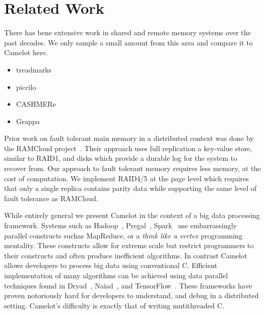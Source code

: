 \section{Related Work}
\label{sec:related}

There has bene extensive work in shared and remote memory systems over the past
decades. We only sample a small amount from this area and compare it to Camelot
here. 

\begin{itemize}
    \item treadmarks~\cite{Keleher1994}  \\
    \item piccilo~\cite{piccolo}   \\
    \item CASHMERe ~\cite{cashmere}   \\
    \item Grappa~\cite{Nelson2015} \\
\end{itemize}

Prior work on fault tolerant main memory in a distributed context was done by
the RAMCloud project~\cite{Ousterhout:2015:RSS:2818727.2806887}. Their approach
uses full replication a key-value store, similar to RAID1, and disks which
provide a durable log for the system to recover from.  Our approach to fault
tolerant memory requires less memory, at the cost of computation. We implement
RAID4/5 at the page level which requires that only a single replica contains
parity data while supporting the same level of fault tolerance as RAMCloud.

While entirely general we present Camelot in the context of a big data
processing framework. Systems such as Hadoop~\cite{Dean2004}, Pregal~\cite{Malewicz:2010:PSL:1807167.1807184}, 
Spark~\cite{180560} use embarrassingly parallel constructs suchas MapReduce, or
a \textit{think like a vertex} programming mentality. These constructs allow for
extreme scale but restrict programmers to their constructs and often produce
inefficient algorithms. In contrast Camelot allows developers to process big
data using conventional C. Efficient implementation of many algorithms can be
achieved using data parallel techniques found in Dryad~\cite{Isard:2007:DDD:1272996.1273005},
Naiad~\cite{Murray2013}, and TensorFlow~\cite{tensorflow2015-whitepaper}. These
frameworks have proven notoriously hard for developers to understand, and debug
in a distributed setting. Camelot's difficulty is exactly that of writing
mutithreaded C.
